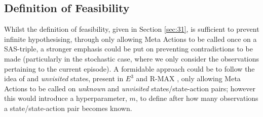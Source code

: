\subsection{Definition of Feasibility}
Whilst the definition of feasibility, given in Section \ref{sec:31}, is sufficient to prevent infinite hypothesising, through only allowing Meta Actions to be called once on a SAS-triple, a stronger emphasis could be put on preventing contradictions to be made (particularly in the stochastic case, where we only consider the observations pertaining to the current episode). A formidable approach could be to follow the idea of  and \textit{unvisited} states, present in $E^3$ \cite{Kearns+Singh:2002} and R-MAX \cite{10.1162/153244303765208377}, only allowing Meta Actions to be called on \textit{unknown} and \textit{unvisited} states/state-action pairs; however this would introduce a hyperparameter, $m$, to define after how many observations a state/state-action pair becomes known.

